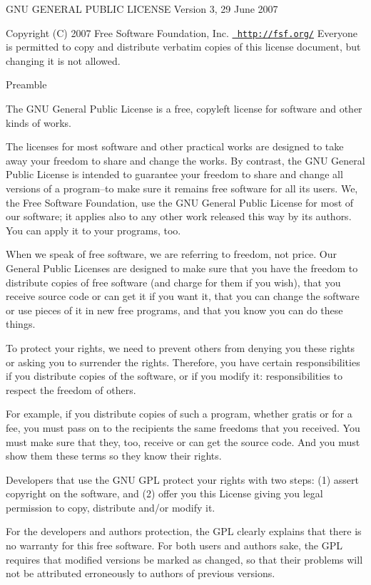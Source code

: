 G\+NU G\+E\+N\+E\+R\+AL P\+U\+B\+L\+IC L\+I\+C\+E\+N\+SE Version 3, 29 June 2007

Copyright (C) 2007 Free Software Foundation, Inc. \href{http://fsf.org/}{\texttt{ http\+://fsf.\+org/}} Everyone is permitted to copy and distribute verbatim copies of this license document, but changing it is not allowed. \begin{DoxyVerb}                       Preamble
\end{DoxyVerb}


The G\+NU General Public License is a free, copyleft license for software and other kinds of works.

The licenses for most software and other practical works are designed to take away your freedom to share and change the works. By contrast, the G\+NU General Public License is intended to guarantee your freedom to share and change all versions of a program--to make sure it remains free software for all its users. We, the Free Software Foundation, use the G\+NU General Public License for most of our software; it applies also to any other work released this way by its authors. You can apply it to your programs, too.

When we speak of free software, we are referring to freedom, not price. Our General Public Licenses are designed to make sure that you have the freedom to distribute copies of free software (and charge for them if you wish), that you receive source code or can get it if you want it, that you can change the software or use pieces of it in new free programs, and that you know you can do these things.

To protect your rights, we need to prevent others from denying you these rights or asking you to surrender the rights. Therefore, you have certain responsibilities if you distribute copies of the software, or if you modify it\+: responsibilities to respect the freedom of others.

For example, if you distribute copies of such a program, whether gratis or for a fee, you must pass on to the recipients the same freedoms that you received. You must make sure that they, too, receive or can get the source code. And you must show them these terms so they know their rights.

Developers that use the G\+NU G\+PL protect your rights with two steps\+: (1) assert copyright on the software, and (2) offer you this License giving you legal permission to copy, distribute and/or modify it.

For the developers\textquotesingle{} and authors\textquotesingle{} protection, the G\+PL clearly explains that there is no warranty for this free software. For both users\textquotesingle{} and authors\textquotesingle{} sake, the G\+PL requires that modified versions be marked as changed, so that their problems will not be attributed erroneously to authors of previous versions.

